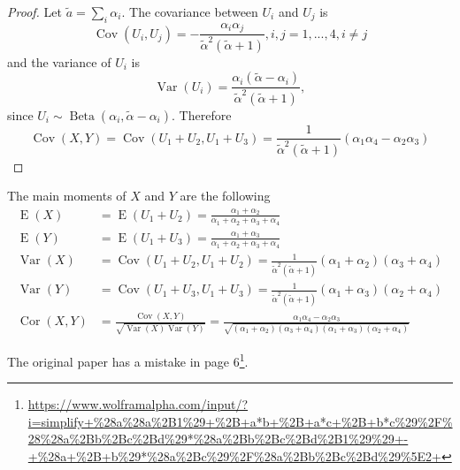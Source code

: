 \documentclass[a4paper, notitlepage, 11pt]{article}
\theoremstyle{definition}
\theoremstyle{remark}
\begin{document}
\begin{proof}

  Let $\tilde{a} = \sum_i \alpha_i$. The covariance between $U_i$ and $U_j$ is \cite[]{lin2016dirichlet} 
\begin{equation}
  \operatorname{Cov}(U_i, U_j) = - \frac{\alpha_i\alpha_j}{\tilde{\alpha}^2(\tilde{\alpha}+1)}, i,j = 1,...,4, i \neq j
\end{equation} 
and the variance of $U_i$ is 
\begin{equation}
  \operatorname{Var}(U_i) = \frac{\alpha_i(\tilde{\alpha}-\alpha_i)}{\tilde{\alpha}^2(\tilde{\alpha}+1)},
\end{equation}
since $U_i \sim \operatorname{Beta}(\alpha_i, \tilde{\alpha} -\alpha_i)$.
Therefore 
\begin{equation}
  \operatorname{Cov}(X,Y) = \operatorname{Cov}(U_1+U_2, U_1+U_3) = \frac{1}{\tilde{\alpha}^2(\tilde{\alpha}+1)}(\alpha_1\alpha_4 - \alpha_2\alpha_3)
\end{equation}
  
\end{proof}

The main moments of $X$ and $Y$ are the following 
\begin{align*}
    \operatorname{E}(X) &= \operatorname{E}(U_1 + U_2) = \frac{\alpha_1+\alpha_2}{\alpha_1+\alpha_2+\alpha_3+\alpha_4} \\
    \operatorname{E}(Y) &= \operatorname{E}(U_1 + U_3) = \frac{\alpha_1+\alpha_3}{\alpha_1+\alpha_2+\alpha_3+\alpha_4} \\
    \operatorname{Var}(X) &= \operatorname{Cov}(U_1+U_2, U_1+U_2) = \frac{1}{\tilde{\alpha}^2(\tilde{\alpha}+1)}(\alpha_1+\alpha_2)(\alpha_3 + \alpha_4) \\
    \operatorname{Var}(Y) &= \operatorname{Cov}(U_1+U_3, U_1+U_3) = \frac{1}{\tilde{\alpha}^2(\tilde{\alpha}+1)}(\alpha_1+\alpha_3)(\alpha_2 + \alpha_4)  \\  
    \operatorname{Cor}(X,Y) &= \frac{\operatorname{Cov}(X,Y)}{\sqrt{\operatorname{Var}(X)\operatorname{Var}(Y)}} = \frac{\alpha_1\alpha_4 - \alpha_2\alpha_3}{\sqrt{(\alpha_1+\alpha_2)(\alpha_3+\alpha_4)(\alpha_1+\alpha_3)(\alpha_2+\alpha_4)}}
\end{align*}

The original paper has a mistake in page
6\footnote{\url{https://www.wolframalpha.com/input/?i=simplify+\%28a\%28a\%2B1\%29+\%2B+a*b+\%2B+a*c+\%2B+b*c\%29\%2F\%28\%28a\%2Bb\%2Bc\%2Bd\%29*\%28a\%2Bb\%2Bc\%2Bd\%2B1\%29\%29+-+\%28a+\%2B+b\%29*\%28a\%2Bc\%29\%2F\%28a\%2Bb\%2Bc\%2Bd\%29\%5E2+}}.
\end{document}

